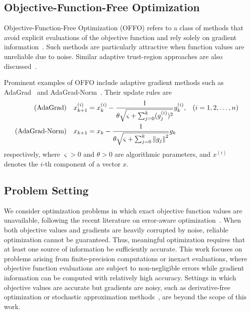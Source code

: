 \documentclass[journal]{subfiles}
\begin{document}
\subsection{Objective-Function-Free Optimization}
\label{sec:prel_offo}

Objective-Function-Free Optimization (OFFO) refers to a class of methods
that avoid explicit evaluations of the objective function and rely solely on gradient information~\citep{Gratton08022024,grattonOFFOMinimizationAlgorithms2023}.
Such methods are particularly attractive when function values are unreliable due to noise.
Similar adaptive trust-region approaches are also discussed~\citep{grapigliaAdaptiveTrustregionMethod2022}.

Prominent examples of OFFO include adaptive gradient methods such as AdaGrad~\citep{duchiAdaptiveSubgradientMethods2011} and AdaGrad-Norm~\citep{wardAdaGradStepsizesSharp2020}.
Their update rules are
\begin{align*}
    \text{(AdaGrad)} \quad x_{k+1}^{(i)}                                      & = x_k^{(i)} -
    \frac{1}{\theta \sqrt{\varsigma + \sum_{j=0}^k (g_j^{(i)})^2}} g_k^{(i)}, &               & (i=1,2,\ldots,n) \\
    \text{(AdaGrad-Norm)} \quad x_{k+1}                                       & = x_k -
    \frac{1}{\theta \sqrt{\varsigma + \sum_{j=0}^k \norm{g_j}^2}} g_k
\end{align*}
respectively, where $\varsigma>0$ and $\theta>0$ are algorithmic parameters, and $x^{(i)}$ denotes the $i$-th component of a vector $x$.

\subsection{Problem Setting}
\label{sec:problem_setting}

We consider optimization problems in which exact objective function values are unavailable, following the recent literature on error-aware optimization~\citep{grattonNoteSolvingNonlinear2020,bellaviaImpactNoiseEvaluation2021,carterNumericalExperienceClass1993,clancyTROPHYTrustRegion2022,sunTrustRegionMethod2023,ruanAdaptiveRegularizedQuasiNewton2024}.
When both objective values and gradients are heavily corrupted by noise, reliable optimization cannot be guaranteed.
Thus, meaningful optimization requires that at least one source of information be sufficiently accurate.
This work focuses on problems arising from finite-precision computations or inexact evaluations, where objective function evaluations are subject to non-negligible errors while gradient information can be computed with relatively high accuracy.
Settings in which objective values are accurate but gradients are noisy, such as derivative-free optimization or stochastic approximation methods~\citep{berahasTheoreticalEmpiricalComparison2021,xie2020analysis,shiNoiseTolerantQuasiNewtonAlgorithm2022}, are beyond the scope of this work.
\end{document}
